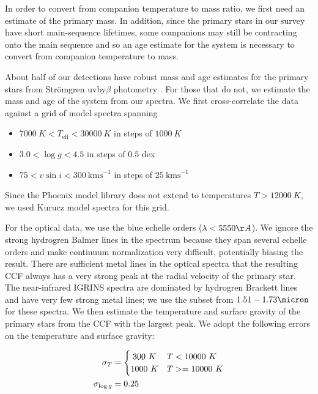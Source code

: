 \documentclass{emulateapj}
\begin{document}
In order to convert from companion temperature to mass ratio, we first need an estimate of the primary mass. In addition, since the primary stars in our survey have short main-sequence lifetimes, some companions may still be contracting onto the main sequence and so an age estimate for the system is necessary to convert from companion temperature to mass.

About half of our detections have robust mass and age estimates for the primary stars from Str\"omgren uvby$\beta$ photometry \citep{David2015}. For those that do not, we estimate the mass and age of the system from our spectra. We first cross-correlate the data against a grid of model spectra spanning

\begin{itemize}
\item $7000\ K < T_\mathrm{eff} < 30000\ K$ in steps of $1000\ K$
\item $3.0 < \log{g} < 4.5$ in steps of $0.5$ dex
\item $75 < v\sin{i} < 300\ \mathrm{km s}^{-1}$ in steps of $25\ \mathrm{km s}^{-1}$
\end{itemize}
Since the Phoenix model library does not extend to temperatures $T > 12000\ K$, we used Kurucz model spectra \citep{Castelli2003} for this grid. 

For the optical data, we use the blue echelle orders ($\lambda < 5550 \AA$). We ignore the strong hydrogren Balmer lines in the spectrum because they span several echelle orders and make continuum normalization very difficult, potentially biasing the result. There are sufficient metal lines in the optical spectra that the resulting CCF always has a very strong peak at the radial velocity of the primary star. The near-infrared IGRINS spectra are dominated by hydrogren Brackett lines and have very few strong metal lines; we use the subset from $1.51 - 1.73 \micron$ for these spectra. We then estimate the temperature and surface gravity of the primary stars from the CCF with the largest peak. We adopt the following errors on the temperature and surface gravity:

\begin{align}
 \sigma_T &= \begin{cases}
      \hfill 300\ K \hfill & T < 10000\ K \\
      \hfill 1000\ K \hfill & T >= 10000\ K \\
     \end{cases} \\
 \sigma_{\log{g}} &= 0.25
\end{align}
\end{document}
